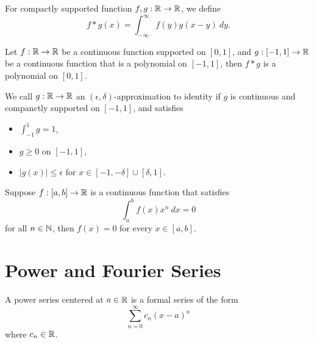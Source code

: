 \documentclass[twoside]{article}
\begin{document}
\begin{definition}[Convolution]
	For compactly supported function $f, g : \mathbb{R} \to \mathbb{R}$, we define
	\begin{equation*}
		f * g(x) = \int_{-\infty}^{\infty} f(y)g(x - y) \ dy.
	\end{equation*}
\end{definition}

\begin{theorem}
	Let $f : \mathbb{R} \to \mathbb{R}$ be a continuous function supported on $[0, 1]$, and
	$g : [-1, 1] \to \mathbb{R}$ be a continuous function that is a polynomial on
	$[-1, 1]$, then $f * g$ is a polynomial on $[0, 1]$.
\end{theorem}

\begin{definition}
	We call $g : \mathbb{R} \to \mathbb{R}$ an $(\epsilon, \delta)$-approximation to identity if $g$ is
	continuous and companctly supported on $[-1, 1]$, and satisfies
	\begin{itemize}
		\item $\int_{-1}^{1} g = 1$,
		\item $g \geq 0$ on $[-1, 1]$,
		\item $|g(x)| \leq \epsilon$ for $x \in [-1, -\delta] \cup [\delta, 1]$.
	\end{itemize}
\end{definition}

\begin{corollary}
    Suppose $f : [a,b] \to \mathbb{R}$ is a continuous function that satisfies
    \begin{equation*}
        \int_{a}^{b} f(x)x^{n} \ dx = 0
    \end{equation*}
    for all $n \in \mathbb{N}$, then $f(x) = 0$ for every $x \in [a,b]$.
\end{corollary}

\newpage
\section{Power and Fourier Series}
\begin{definition}
    A power series centered at $a \in \mathbb{R}$ is a formal series of the form
    \begin{equation*}
        \sum_{n = 0}^{\infty}c_{n}(x - a)^{n}
    \end{equation*}
    where $c_{n} \in \mathbb{R}$.
\end{definition}
\end{document}
